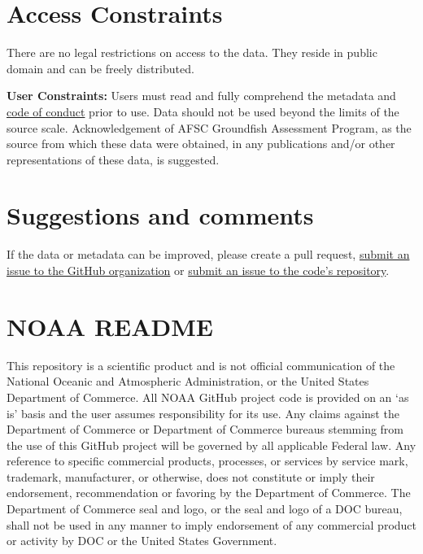 \documentclass[
  letterpaper,
  oneside,
  open=any]{scrbook}
\begin{document}
\section*{Access Constraints}\label{access-constraints}


There are no legal restrictions on access to the data. They reside in
public domain and can be freely distributed.

\textbf{User Constraints:} Users must read and fully comprehend the
metadata and
\href{https://afsc-gap-products.github.io/gap_products/content/code-of-conduct.html}{code
of conduct} prior to use. Data should not be used beyond the limits of
the source scale. Acknowledgement of AFSC Groundfish Assessment Program,
as the source from which these data were obtained, in any publications
and/or other representations of these data, is suggested.

\section*{Suggestions and comments}\label{suggestions-and-comments}


If the data or metadata can be improved, please create a pull request,
\href{https://github.com/afsc-gap-products/data-requests/issues}{submit
an issue to the GitHub organization} or
\href{https://github.com/afsc-gap-products/gap_products/issues}{submit
an issue to the code's repository}.

\section*{NOAA README}\label{noaa-readme}


This repository is a scientific product and is not official
communication of the National Oceanic and Atmospheric Administration, or
the United States Department of Commerce. All NOAA GitHub project code
is provided on an `as is' basis and the user assumes responsibility for
its use. Any claims against the Department of Commerce or Department of
Commerce bureaus stemming from the use of this GitHub project will be
governed by all applicable Federal law. Any reference to specific
commercial products, processes, or services by service mark, trademark,
manufacturer, or otherwise, does not constitute or imply their
endorsement, recommendation or favoring by the Department of Commerce.
The Department of Commerce seal and logo, or the seal and logo of a DOC
bureau, shall not be used in any manner to imply endorsement of any
commercial product or activity by DOC or the United States Government.
\end{document}
